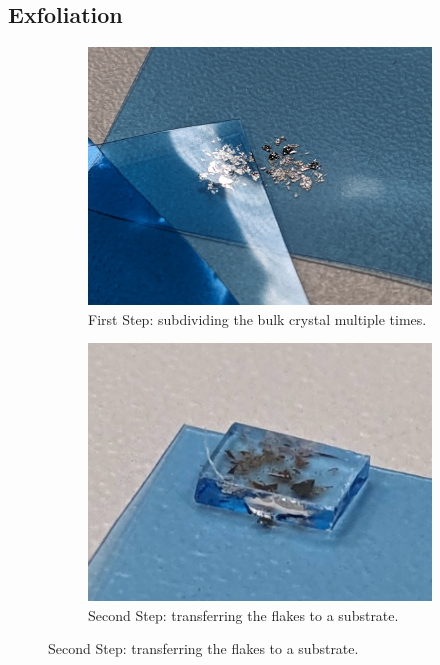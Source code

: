 \documentclass[
	twoside,
	parskip=half,
	a4paper,
]{scrbook}
\begin{document}
\subsection{Exfoliation}
\begin{figure}
	\centering
	\begin{subfigure}[t]{.3\textwidth}
		\vskip 0pt
		\includegraphics[width=\textwidth]{../../photos/exfoliation.jpg}
		\caption{First Step: subdividing the bulk crystal multiple times.}
		\label{fig:exfoliation_division}
	\end{subfigure}
	\begin{subfigure}[t]{.3\textwidth}
		\vskip 0pt
		\includegraphics[width=\textwidth]{../../photos/exfoliation glass.jpg}
		\caption{Second Step: transferring the flakes to a substrate.}

\end{subfigure}
\end{figure}
\end{document}
